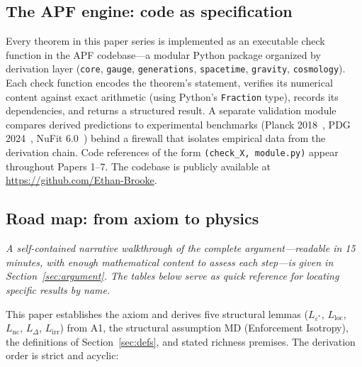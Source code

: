 \documentclass[11pt]{article}
\theoremstyle{remark}
\begin{document}
\subsection{The APF engine: code as specification}

Every theorem in this paper series is implemented as an executable check function in the APF codebase---a modular Python package organized by derivation layer (\texttt{core}, \texttt{gauge}, \texttt{generations}, \texttt{spacetime}, \texttt{gravity}, \texttt{cosmology}).  Each check function encodes the theorem's statement, verifies its numerical content against exact arithmetic (using Python's \texttt{Fraction} type), records its dependencies, and returns a structured result.  A separate validation module compares derived predictions to experimental benchmarks (Planck 2018~\cite{Planck2018}, PDG 2024~\cite{PDG2024}, NuFit 6.0~\cite{NuFit2024}) behind a firewall that isolates empirical data from the derivation chain.  Code references of the form \texttt{(check\_X, module.py)} appear throughout Papers 1--7.  The codebase is publicly available at \url{https://github.com/Ethan-Brooke}.


\subsection{Road map: from axiom to physics}

\noindent\textit{A self-contained narrative walkthrough of the complete argument---readable in 15 minutes, with enough mathematical content to assess each step---is given in Section~\ref{sec:argument}.  The tables below serve as quick reference for locating specific results by name.}

\medskip
This paper establishes the axiom and derives five structural lemmas ($L_{\varepsilon^*}$, $L_{\mathrm{loc}}$, $L_{\mathrm{nc}}$, $L_\Delta$, $L_{\mathrm{irr}}$) from A1, the structural assumption MD (Enforcement Isotropy), the definitions of Section~\ref{sec:defs}, and stated richness premises.  The derivation order is strict and acyclic:
\end{document}
